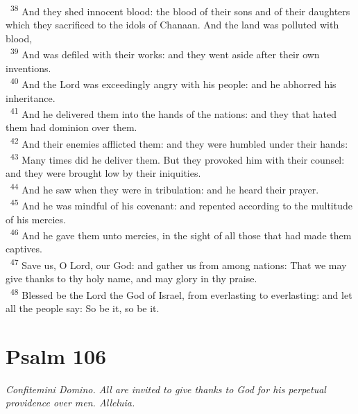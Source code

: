 \documentclass[a5paper,12pt]{article}
\begin{document}
\begin{multicols*}{2}
~\textsuperscript{38} And they shed innocent blood: the blood of their sons and of their daughters which they sacrificed to the idols of Chanaan. And the land was polluted with blood,\\
~\textsuperscript{39} And was defiled with their works: and they went aside after their own inventions.\\
~\textsuperscript{40} And the Lord was exceedingly angry with his people: and he abhorred his inheritance.\\
~\textsuperscript{41} And he delivered them into the hands of the nations: and they that hated them had dominion over them.\\
~\textsuperscript{42} And their enemies afflicted them: and they were humbled under their hands:\\
~\textsuperscript{43} Many times did he deliver them. But they provoked him with their counsel: and they were brought low by their iniquities.\\
~\textsuperscript{44} And he saw when they were in tribulation: and he heard their prayer.\\
~\textsuperscript{45} And he was mindful of his covenant: and repented according to the multitude of his mercies.\\
~\textsuperscript{46} And he gave them unto mercies, in the sight of all those that had made them captives.\\
~\textsuperscript{47} Save us, O Lord, our God: and gather us from among nations: That we may give thanks to thy holy name, and may glory in thy praise.\\
~\textsuperscript{48} Blessed be the Lord the God of Israel, from everlasting to everlasting: and let all the people say: So be it, so be it.\\

\section{Psalm 106}
\label{sec:org1d6cc1e}
\emph{Confitemini Domino. All are invited to give thanks to God for his perpetual providence over men. Alleluia.}\\


\end{multicols*}
\end{document}

